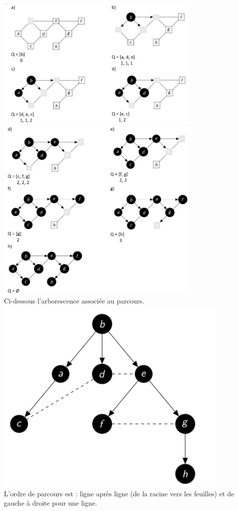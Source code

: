 \begin{Exercice}[5 minutes]
	\begin{solution}
		\includegraphics[width=10cm]{solutions/BFS1.PNG}\\
		\includegraphics[width=10cm]{solutions/BFS2.PNG}\\
 		Ci-dessous l'arborescence associée au parcours.\\
		\includegraphics[]{solutions/BFS3.PNG}\\
		L’ordre de parcours est : ligne après ligne (de la racine vers les feuilles) et
		de gauche à droite pour une ligne.
	\end{solution}
\end{Exercice}%
